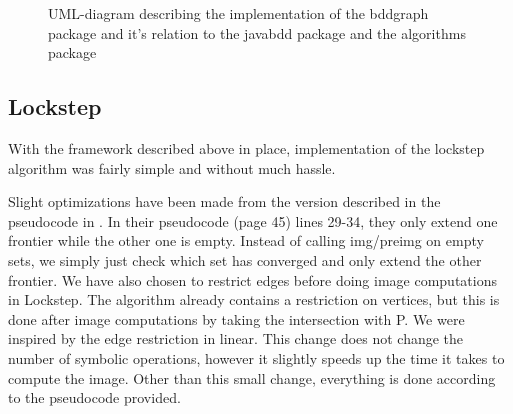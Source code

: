 \documentclass[../master/master.tex]{subfiles}
\begin{document}
\begin{figure}[H]
\begin{center}
\end{center}
\caption{UML-diagram describing the implementation of the bddgraph package and it's relation to the javabdd package and the algorithms package}
\label{main_uml}
\end{figure}

\subsection{Lockstep}
With the framework described above in place, implementation of the lockstep algorithm was fairly simple and without much hassle.

Slight optimizations have been made from the version described in the pseudocode in \cite{lockstep}. In their pseudocode (page 45) lines 29-34, they only extend one frontier while the other one is empty. Instead of calling img/preimg on empty sets, we simply just check which set has converged and only extend the other frontier. We have also chosen to restrict edges before doing image computations in Lockstep. The algorithm already contains a restriction on vertices, but this is done after image computations by taking the intersection with P. We were inspired by the edge restriction in linear. This change does not change the number of symbolic operations, however it slightly speeds up the time it takes to compute the image.
Other than this small change, everything is done according to the pseudocode provided.

\begin{algorithm}[H]
  \begin{algorithmic}
      \EndWhile
      \Else
      \EndWhile
    \EndIf
  \end{algorithmic}
\end{algorithm}
\end{document}
